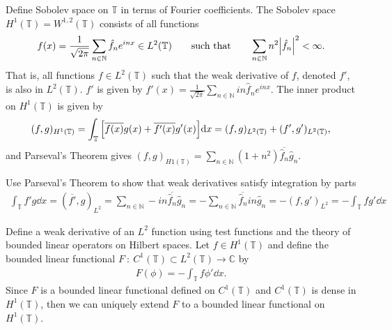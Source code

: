 \documentclass[avery5388,grid,frame]{flashcards}
\def\Cx{\mathbb{C}}
\def\torus{\mathbb{T}}
\begin{document}
\begin{flashcard}
    {Define Sobolev space on $\torus$ in terms of Fourier coefficients.}
    The Sobolev space $H^1(\torus) = W^{1,2}(\torus)$ consists of all functions
    \begin{align*}
        f(x) = \frac{1}{\sqrt{2\pi}}\sum_{n \in \mathbb{N}}\hat{f}_n e^{inx} \in L^2(\torus) \qquad \text{such that} \qquad \sum_{n \in \mathbb{N}} n^2 \abs{\hat{f}_n}^2 < \infty.
    \end{align*}
    That is, all functions $f \in L^2(\torus)$ such that the weak derivative of $f$, denoted $f'$, is also in $L^2(\torus)$.  $f'$ is given by $\displaystyle f'(x) = \frac{1}{\sqrt{2\pi}}\sum_{n\in\mathbb{N}}in\hat{f}_n e^{inx}$.
    The inner product on $H^1(\torus)$ is given by
    \begin{align*}
        (f, g)_{H^1(\torus)} = \int_\torus \qty[\overline{f(x)}g(x) + \overline{f'(x)}g'(x)]\dd x = (f, g)_{L^2(\torus)} + (f', g')_{L^2(\torus)},
    \end{align*}
    and Parseval's Theorem gives $\displaystyle (f,g)_{H1(\torus)} = \sum_{n\in\mathbb{N}}(1 + n^2)\overline{\hat{f}_n}\hat{g}_n$.
\end{flashcard}

\begin{flashcard}
    {Use Parseval's Theorem to show that weak derivatives satisfy integration by parts}
    \begin{align*}
        \int_\torus f'g \dd x = (\overline{f'},g)_{L^2} = \sum_{n\in\mathbb{N}}-in\overline{\hat{f}_n}\hat{g}_n = -\sum_{n\in\mathbb{N}}\overline{\hat{f}_n}in\hat{g}_n = -(f,g')_{L^2} = -\int_\torus fg' \dd x
    \end{align*}
\end{flashcard}

\begin{flashcard}
    {Define a weak derivative of an $L^2$ function using test functions and the theory of bounded linear operators on Hilbert spaces.}
    Let $f \in H^1(\torus)$ and define the bounded linear functional $F\ :\ C^1(\torus) \subset L^2(\torus) \rightarrow \Cx$ by
    \begin{align*}
        F(\phi) = -\int_\torus f \phi' \dd x.
    \end{align*}
    Since $F$ is a bounded linear functional defined on $C^1(\torus)$ and $C^1(\torus)$ is dense in $H^1(\torus)$, then we can uniquely extend $F$ to a bounded linear functional on $H^1(\torus)$.
\end{flashcard}
\end{document}
